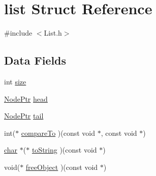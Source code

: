 \hypertarget{structlist}{\section{list Struct Reference}
\label{structlist}
}


{\ttfamily \#include $<$List.\-h$>$}

\subsection*{Data Fields}
\begin{DoxyCompactItemize}
\item 
int \hyperlink{structlist_a3b03adad0c0429bae9493667ff366dc2}{size}
\item 
\hyperlink{Node_8h_aa6eec21621b8638e350fd0ec238a9715}{Node\-Ptr} \hyperlink{structlist_a357a56cbe66297fb5cc5cd8ba9fa6cf4}{head}
\item 
\hyperlink{Node_8h_aa6eec21621b8638e350fd0ec238a9715}{Node\-Ptr} \hyperlink{structlist_a7fba27040dab68e2d6acc2885b6df167}{tail}
\item 
int($\ast$ \hyperlink{structlist_ad3ad01e7ea22f2e0590e1d5549c8ab7f}{compare\-To} )(const void $\ast$, const void $\ast$)
\item 
\hyperlink{wf_8c_ab4771625a6a6b50b256ed1a164561cc5}{char} $\ast$($\ast$ \hyperlink{structlist_a3447393f975f748b5df5247155e9298a}{to\-String} )(const void $\ast$)
\item 
void($\ast$ \hyperlink{structlist_a04091cb910e425d1226562197fe0bf8c}{free\-Object} )(const void $\ast$)
\end{DoxyCompactItemize}


